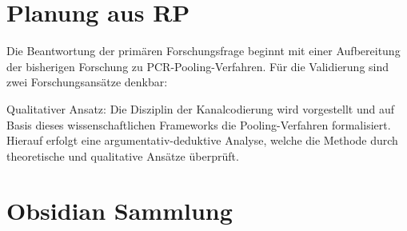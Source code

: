 \cleardoublepage


\section{Planung aus RP}
Die Beantwortung der primären Forschungsfrage beginnt mit einer Aufbereitung der bisherigen Forschung zu PCR-Pooling-Verfahren.
Für die Validierung sind zwei Forschungsansätze denkbar:

Qualitativer Ansatz:
Die Disziplin der Kanalcodierung wird vorgestellt und auf Basis dieses wissenschaftlichen Frameworks die Pooling-Verfahren formalisiert.
Hierauf erfolgt eine argumentativ-deduktive Analyse, welche die Methode durch theoretische und qualitative Ansätze überprüft.


\section{Obsidian Sammlung}
